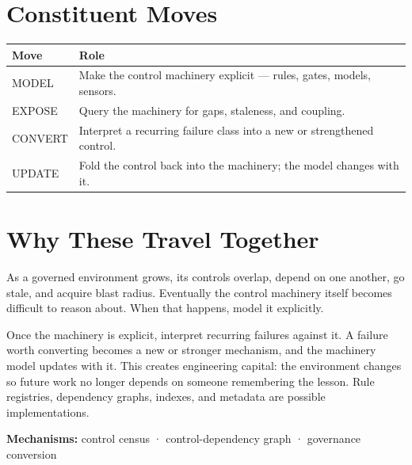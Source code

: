 \section{Constituent Moves}\label{heading:constituent-moves}

{\footnotesize
{\def\LTcaptype{none} %
\begin{longtable}[]{@{}
  >{\raggedright\arraybackslash}p{}
  >{\raggedright\arraybackslash}p{}@{}}
\toprule\noalign{}
\begin{minipage}[b]{\linewidth}\raggedright
Move
\end{minipage} & \begin{minipage}[b]{\linewidth}\raggedright
Role
\end{minipage} \\
\midrule\noalign{}
\endhead
\bottomrule\noalign{}
\endlastfoot
MODEL & Make the control machinery explicit --- rules, gates, models, sensors. \\
EXPOSE & Query the machinery for gaps, staleness, and coupling. \\
CONVERT & Interpret a recurring failure class into a new or strengthened control. \\
UPDATE & Fold the control back into the machinery; the model changes with it. \\
\end{longtable}
}
}

\section{Why These Travel Together}\label{heading:why-these-travel-together}

As a governed environment grows, its controls overlap, depend on one another, go stale, and acquire blast radius. Eventually the control machinery itself becomes difficult to reason about. When that happens, model it explicitly.

Once the machinery is explicit, interpret recurring failures against it. A failure worth converting becomes a new or stronger mechanism, and the machinery model updates with it. This creates engineering capital: the environment changes so future work no longer depends on someone remembering the lesson. Rule registries, dependency graphs, indexes, and metadata are possible implementations.

\textbf{Mechanisms:} control census · control-dependency graph · governance conversion
